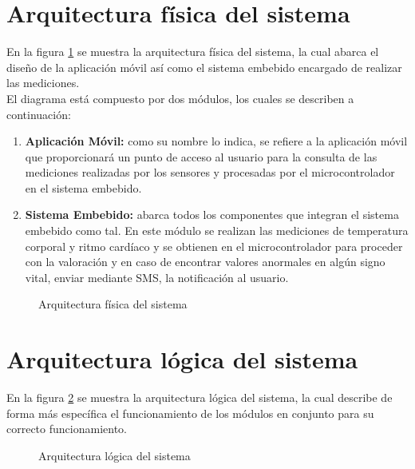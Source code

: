 \section{Arquitectura física del sistema}
En la figura \ref{fig:DisenoArquiFisica} se muestra la arquitectura física del sistema, la cual abarca el diseño de la aplicación móvil así como el sistema embebido encargado de realizar las mediciones.\\

El diagrama está compuesto por dos módulos, los cuales se describen a continuación:
\begin{enumerate}
	\item \textbf{Aplicación Móvil:} como su nombre lo indica, se refiere a la aplicación móvil que proporcionará un punto de acceso al usuario para la consulta de las mediciones realizadas por los sensores y procesadas por el microcontrolador en el sistema embebido. 
	\item \textbf{Sistema Embebido:} abarca todos los componentes que integran el sistema embebido como tal. En este módulo se realizan las mediciones de temperatura corporal y ritmo cardíaco y se obtienen en el microcontrolador para proceder con la valoración y en caso de encontrar valores anormales en algún signo vital, enviar mediante SMS, la notificación al usuario.
\end{enumerate}

\begin{figure}[htbp!]
	\centering
	\caption{Arquitectura física del sistema}
	\label{fig:DisenoArquiFisica}
\end{figure}
\clearpage

\section{Arquitectura lógica del sistema}
En la figura \ref{fig:DisenoArquiLogica} se muestra la arquitectura lógica del sistema, la cual describe de forma más específica el funcionamiento de los módulos en conjunto para su correcto funcionamiento.\\



\begin{figure}[htbp!]
	\centering
	\caption{Arquitectura lógica del sistema}
	\label{fig:DisenoArquiLogica}
\end{figure}